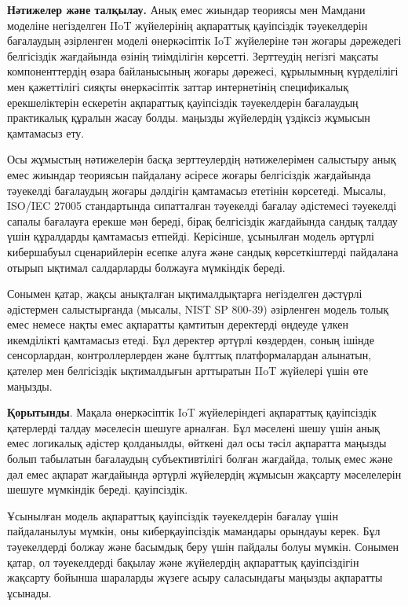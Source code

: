 \begin{multicols}{2}
{\bfseries Нәтижелер және талқылау.} Анық емес жиындар теориясы мен Мамдани
моделіне негізделген IIoT жүйелерінің ақпараттық қауіпсіздік
тәуекелдерін бағалаудың әзірленген моделі өнеркәсіптік IoT жүйелеріне
тән жоғары дәрежедегі белгісіздік жағдайында өзінің тиімділігін
көрсетті. Зерттеудің негізгі мақсаты компоненттердің өзара байланысының
жоғары дәрежесі, құрылымның күрделілігі мен қажеттілігі сияқты
өнеркәсіптік заттар интернетінің спецификалық ерекшеліктерін ескеретін
ақпараттық қауіпсіздік тәуекелдерін бағалаудың практикалық құралын жасау
болды. маңызды жүйелердің үздіксіз жұмысын қамтамасыз ету.

Осы жұмыстың нәтижелерін басқа зерттеулердің нәтижелерімен салыстыру
анық емес жиындар теориясын пайдалану әсіресе жоғары белгісіздік
жағдайында тәуекелді бағалаудың жоғары дәлдігін қамтамасыз ететінін
көрсетеді. Мысалы, ISO/IEC 27005 стандартында сипатталған тәуекелді
бағалау әдістемесі тәуекелді сапалы бағалауға ерекше мән береді, бірақ
белгісіздік жағдайында сандық талдау үшін құралдарды қамтамасыз етпейді.
Керісінше, ұсынылған модель әртүрлі кибершабуыл сценарийлерін есепке
алуға және сандық көрсеткіштерді пайдалана отырып ықтимал салдарларды
болжауға мүмкіндік береді.

Сонымен қатар, жақсы анықталған ықтималдықтарға негізделген дәстүрлі
әдістермен салыстырғанда (мысалы, NIST SP 800-39) әзірленген модель
толық емес немесе нақты емес ақпаратты қамтитын деректерді өңдеуде үлкен
икемділікті қамтамасыз етеді. Бұл деректер әртүрлі көздерден, соның
ішінде сенсорлардан, контроллерлерден және бұлттық платформалардан
алынатын, қателер мен белгісіздік ықтималдығын арттыратын IIoT жүйелері
үшін өте маңызды.

{\bfseries Қорытынды}. Мақала өнеркәсіптік IoT жүйелеріндегі ақпараттық
қауіпсіздік қатерлерді талдау мәселесін шешуге арналған. Бұл мәселені
шешу үшін анық емес логикалық әдістер қолданылды, өйткені дәл осы тәсіл
ақпаратта маңызды болып табылатын бағалаудың субъективтілігі болған
жағдайда, толық емес және дәл емес ақпарат жағдайында әртүрлі жүйелердің
жұмысын жақсарту мәселелерін шешуге мүмкіндік береді. қауіпсіздік.

Ұсынылған модель ақпараттық қауіпсіздік тәуекелдерін бағалау үшін
пайдаланылуы мүмкін, оны киберқауіпсіздік мамандары орындауы керек. Бұл
тәуекелдерді болжау және басымдық беру үшін пайдалы болуы мүмкін.
Сонымен қатар, ол тәуекелдерді бақылау және жүйелердің ақпараттық
қауіпсіздігін жақсарту бойынша шараларды жүзеге асыру саласындағы
маңызды ақпаратты ұсынады.
\end{multicols}

